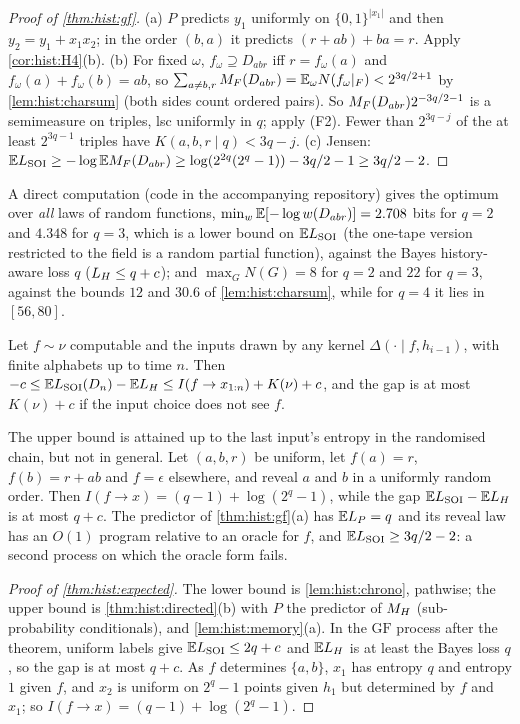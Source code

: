 \begin{proof}[Proof of \cref{thm:hist:gf}]
(a) $P$ predicts $y_1$ uniformly on $\{0,1\}^{|x_1|}$ and then $y_2=y_1+x_1x_2$; in the order $(b,a)$ it predicts $(r+ab)+ba=r$. Apply \cref{cor:hist:H4}(b). (b) For fixed $\omega$, $f_\omega\supseteq D_{abr}$ iff $r=f_\omega(a)$ and $f_\omega(a)+f_\omega(b)=ab$, so $\sum_{a\ne b,r}M_{F}(D_{abr})=\mathbb{E}_\omega N(f_\omega|_F)<2^{3q/2+1}$ by \cref{lem:hist:charsum} (both sides count ordered pairs). So $M_{F}(D_{abr})2^{-3q/2-1}$ is a semimeasure on triples, lsc uniformly in $q$; apply (F2). Fewer than $2^{3q-j}$ of the at least $2^{3q-1}$ triples have $K(a,b,r\mid q)<3q-j$. (c) Jensen: $\mathbb{E}L_{\mathrm{SOI}}\ge-\log\mathbb{E}M_{F}(D_{abr})\ge\log(2^{2q}(2^q-1))-3q/2-1\ge3q/2-2$.
\end{proof}

A direct computation (code in the accompanying repository) gives the optimum over \emph{all} laws of random functions, $\min_w\mathbb{E}[-\log w(D_{abr})]=2.708$ bits for $q=2$ and $4.348$ for $q=3$, which is a lower bound on $\mathbb{E}L_{\mathrm{SOI}}$ (the one-tape version restricted to the field is a random partial function), against the Bayes history-aware loss $q$ ($L_{H}\le q+c$); and $\max_GN(G)=8$ for $q=2$ and $22$ for $q=3$, against the bounds $12$ and $30.6$ of \cref{lem:hist:charsum}, while for $q=4$ it lies in $[56,80]$.

\begin{theorem}\label{thm:hist:expected}
Let $f\sim\nu$ computable and the inputs drawn by any kernel $\Delta(\cdot\mid f,h_{i-1})$, with finite alphabets up to time $n$. Then $-c\le\mathbb{E}L_{\mathrm{SOI}}(D_n)-\mathbb{E}L_{H}\le I(f\to x_{1:n})+K(\nu)+c$, and the gap is at most $K(\nu)+c$ if the input choice does not see $f$.
\end{theorem}

The upper bound is attained up to the last input's entropy in the randomised chain, but not in general. Let $(a,b,r)$ be uniform, let $f(a)=r$, $f(b)=r+ab$ and $f=\epsilon$ elsewhere, and reveal $a$ and $b$ in a uniformly random order. Then $I(f\to x)=(q-1)+\log(2^q-1)$, while the gap $\mathbb{E}L_{\mathrm{SOI}}-\mathbb{E}L_{H}$ is at most $q+c$. The predictor of \cref{thm:hist:gf}(a) has $\mathbb{E} L_P=q$ and its reveal law has an $O(1)$ program relative to an oracle for $f$, and $\mathbb{E}L_{\mathrm{SOI}}\ge3q/2-2$: a second process on which the oracle form fails.

\begin{proof}[Proof of \cref{thm:hist:expected}]
The lower bound is \cref{lem:hist:chrono}, pathwise; the upper bound is \cref{thm:hist:directed}(b) with $P$ the predictor of $M_{H}$ (sub-probability conditionals), and \cref{lem:hist:memory}(a). In the $\mathrm{GF}$ process after the theorem, uniform labels give $\mathbb{E}L_{\mathrm{SOI}}\le2q+c$ and $\mathbb{E}L_{H}$ is at least the Bayes loss $q$, so the gap is at most $q+c$. As $f$ determines $\{a,b\}$, $x_1$ has entropy $q$ and entropy $1$ given $f$, and $x_2$ is uniform on $2^q-1$ points given $h_1$ but determined by $f$ and $x_1$; so $I(f\to x)=(q-1)+\log(2^q-1)$.
\end{proof}

